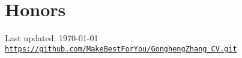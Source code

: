 \documentclass[letterpaper]{article}
\def\footerlink{https://github.com/MakeBestForYou/GonghengZhang\_CV.git}
\renewenvironment{itemize}{
  \begin{list}{}{
    \setlength{\leftmargin}{1.5em}
  }
}{
  \end{list}
}
\begin{document}
\section*{Honors}
\begin{itemize}
\item 


\end{itemize}




\bigskip

\begin{center}
  \begin{footnotesize}
    Last updated: \today \\
    \href{\footerlink}{\texttt{\footerlink}}
  \end{footnotesize}
\end{center}
\end{document}
